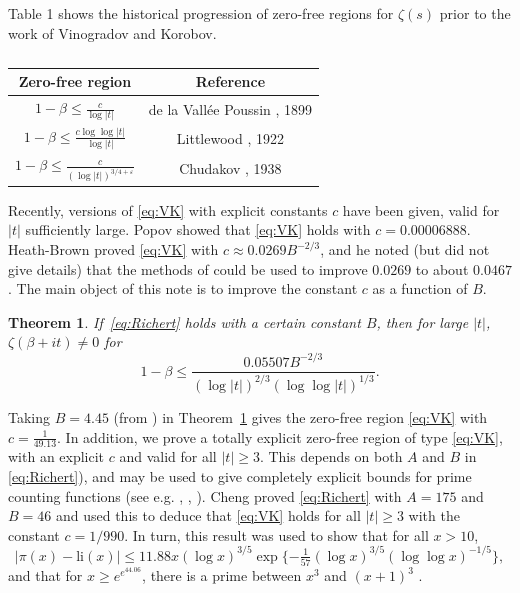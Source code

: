 \documentclass[10pt]{amsart}
\theoremstyle{remark}
\theoremstyle{plain}
\newtheorem{theorem}{Theorem}
\numberwithin{equation}{section}
\theoremstyle{definition}
\def\ds{\displaystyle}
\def\eps{\varepsilon}
\begin{document}
Table 1 shows the historical progression of zero-free regions
for $\zeta(s)$ prior to the work of Vinogradov and Korobov. 
\begin{table}[h]
\setlength{\extrarowheight}{10pt}
\begin{tabular}{|c|c|} \hline
Zero-free region & Reference \\ \hline
$\ds 1-\beta \le  \frac{c}{\log |t|}$ & 
de la Vall\'ee Poussin \cite{VP}, 1899 \\
$\ds 1-\beta \le  \frac{c\log\log |t|}{\log |t|}$ & Littlewood \cite{L},
 1922 \\
$\ds 1-\beta \le \frac{c}{(\log |t|)^{3/4+\eps}}$ &
Chudakov \cite{Chu}, 1938 \\
\hline
\end{tabular}
\smallskip
\caption{}
\end{table}
\bigskip

Recently,  versions of \eqref{eq:VK} with explicit constants $c$ have been 
given, valid for $|t|$ sufficiently large.
Popov \cite{P} showed that \eqref{eq:VK}
holds with $c=0.00006888$.  Heath-Brown \cite{HB1} proved \eqref{eq:VK} with
$c \approx 0.0269 B^{-2/3}$, and he noted (but did not give details)
that the methods
of \cite{HB2} could be used to improve $0.0269$ to about $0.0467$.
The main object of this note is to
improve the constant $c$ as a function of $B$.

\begin{theorem} \label{thm1}
If~\eqref{eq:Richert} holds with a certain constant $B$, then
for large $|t|$, $\zeta(\beta+it) \ne 0$ for
$$
1-\beta \le \frac{0.05507 B^{-2/3}}{(\log |t|)^{2/3} (\log\log |t|)^{1/3}}.
$$
\end{theorem}

Taking $B=4.45$ (from \cite{F}) in Theorem~\ref{thm1}
 gives the zero-free region \eqref{eq:VK} with
$c=\frac{1}{49.13}$.
In addition, we prove a totally explicit zero-free region
of type \eqref{eq:VK}, with an explicit $c$ and valid for all $|t|\ge 3$.
This depends on both $A$ and $B$ in \eqref{eq:Richert}), and 
may be used to give completely explicit
bounds for prime counting functions (see e.g. \cite{RS1}, \cite{RS2}, 
\cite{RR}).  Cheng \cite{Ch2} proved \eqref{eq:Richert} with
$A=175$ and $B=46$ and used this to deduce that
\eqref{eq:VK} holds for all $|t| \ge 3$ with the
constant $c=1/990$.  In turn, this result was used to show \cite{Ch3} that for
all $x>10$,
$$
\bigl|\pi(x) - \text{li}(x)\bigr| \le 11.88 x
 (\log x)^{3/5}  \exp \{ - \tfrac1{57}
 (\log x)^{3/5} (\log\log x)^{-1/5} \},
$$
and that for $x\ge e^{e^{44.06}}$, there is a prime between $x^3$ and
$(x+1)^3$ \cite{Ch4}.
\end{document}

